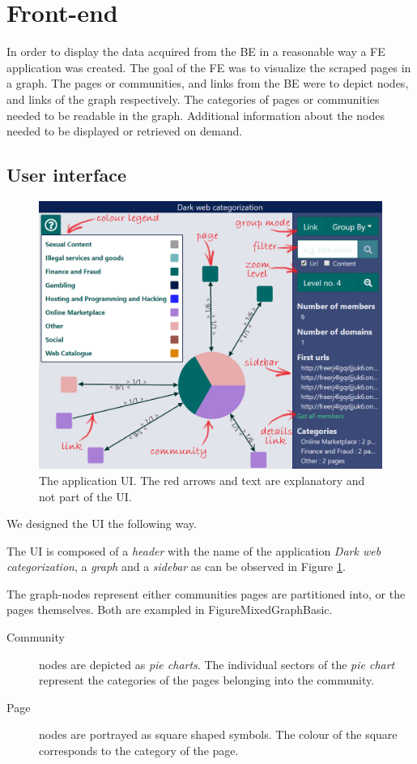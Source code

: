 \section{Front-end}
In order to display the data acquired from the BE in a reasonable way a FE application was created. The goal of the FE was to visualize the scraped pages in a graph. The pages or communities, and links from the BE were to depict nodes, and links of the graph respectively. The categories of pages or communities needed to be readable in the graph. Additional information about the nodes needed to be displayed or retrieved on demand.

\subsection{User interface} \label{FEUI}
\begin{figure}[ht]
  \centering
  \includegraphics[width=\textwidth]{Images/basic_view.png}
  \caption{The application UI. The red arrows and text are explanatory and not part of the UI.}
  \label{MixedGraphBasic}
\end{figure}  
We designed the UI the following way.

The UI is composed of a \textit{header} with the name of the application \textit{Dark web categorization}, a \textit{graph} and a \textit{sidebar} as can be observed in Figure \ref{MixedGraphBasic}. 

The graph-nodes represent either communities pages are partitioned into, or the pages themselves. Both are exampled in Figure{MixedGraphBasic}.
\begin{description}
    \item[Community]  nodes are depicted as \textit{pie charts}. The individual sectors of the \textit{pie chart} represent the categories of the pages belonging into the community. 
    \item[Page] nodes are portrayed as square shaped symbols. The colour of the square corresponds to the category of the page.
\end{description}  

